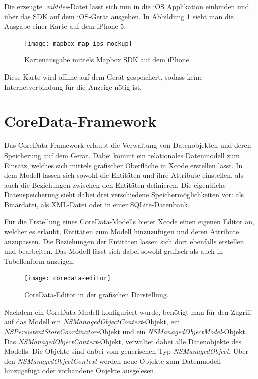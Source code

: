 Die erzeugte \emph{.mbtiles}-Datei lässt sich nun in die iOS Applikation einbinden und über das SDK auf dem iOS-Gerät ausgeben. In Abbildung \ref{mapbox-map-ios} sieht man die Ausgabe einer Karte auf dem iPhone 5.

\begin{figure}[htb!]
		\centering
	\texttt{[image: mapbox-map-ios-mockup]}
	\caption{Kartenausgabe mittels Mapbox SDK auf dem iPhone}
	\label{mapbox-map-ios}
\end{figure}

Diese Karte wird offline auf dem Gerät gespeichert, sodass keine Internetverbindung für die Anzeige nötig ist.

\section{CoreData-Framework}
\label{sec:technologies:coredata}
Das CoreData-Framework erlaubt die Verwaltung von Datenobjekten und deren Speicherung auf dem Gerät.
Dabei kommt ein relationales Datenmodell zum Einsatz, welches sich mittels grafischer Oberfläche in Xcode erstellen lässt.
In dem Modell lassen sich sowohl die Entitäten und ihre Attribute einstellen, als auch die Beziehungen zwischen den Entitäten definieren.
Die eigentliche Datenspeicherung sieht dabei drei verschiedene Speichermöglichkeiten vor: als Binärdatei, als XML-Datei oder in einer SQLite-Datenbank. 

Für die Erstellung eines CoreData-Modells bietet Xcode einen eigenen Editor an, welcher es erlaubt, Entitäten zum Modell hinzuzufügen und deren Attribute anzupassen. Die Beziehungen der Entitäten lassen sich dort ebenfalls erstellen und bearbeiten. Das Modell lässt sich dabei sowohl grafisch als auch in Tabellenform anzeigen.

\begin{figure}[htb!]
		\centering
	\texttt{[image: coredata-editor]}
	\caption{CoreData-Editor in der grafischen Darstellung.}
	\label{coredata-model}
\end{figure}


Nachdem ein CoreData-Modell konfiguriert wurde, benötigt man für den Zugriff auf das Modell ein \emph{NSManagedObjectContext}-Objekt, ein \emph{NSPersistentStoreCoordinator}-Objekt und ein \emph{NSManagedObjectModel}-Objekt. Das \emph{NSManagedObjectContext}-Objekt, verwaltet dabei alle Datenobjekte des Modells. Die Objekte sind dabei vom generischen Typ \emph{NSManagedObject}. Über den \emph{NSManagedObjectContext} werden neue Objekte zum Datenmodell hinzugefügt oder vorhandene Onjekte ausgelesen.


